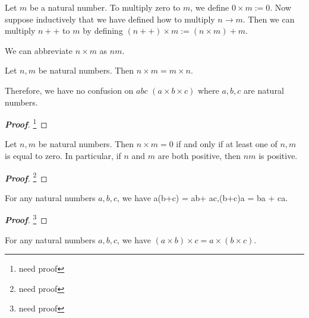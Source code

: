 \begin{definition}
Let $m$ be a natural number. To multiply zero to $m$, we define $0\times m:=0$. Now suppose inductively that we have defined how to multiply $n \to m$. Then we can multiply $n++$ to $m$ by defining $(n++)\times m := (n\times m)+m$.
\end{definition}

\begin{remark}
We can abbreviate $n\times m$ as $nm$.
\end{remark}

\begin{lemma}
Let $n,m$ be natural numbers. Then $n\times m = m \times n$.
\end{lemma}

\begin{remark}
Therefore, we have no confusion on $abc$ $(a\times b\times c)$ where $a,b,c$ are natural numbers.
\end{remark}


\begin{proof}[\bf Proof]
\footnote{need proof}
\end{proof}

\begin{lemma}
Let $n,m$ be natural numbers. Then $n\times m = 0$ if and only if at least one of $n,m$ is equal to zero. In particular, if $n$ and $m$ are both positive, then $nm$ is positive.
\end{lemma}

\begin{proof}[\bf Proof]
\footnote{need proof}
\end{proof}

\begin{proposition}
For any natural numbers $a,b,c$, we have
\be
a(b+c) = ab+ ac,\quad (b+c)a = ba + ca.
\ee
\end{proposition}

\begin{proof}[\bf Proof]
\footnote{need proof}
\end{proof}

\begin{proposition}
For any natural numbers $a,b,c$, we have $(a\times b)\times c = a\times (b\times c)$.
\end{proposition}

